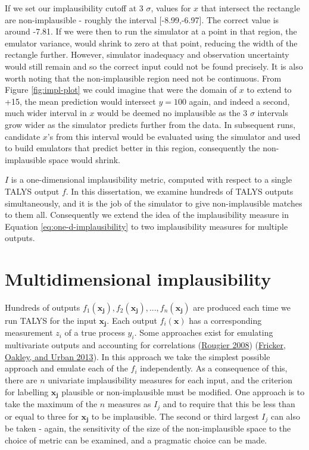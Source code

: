\documentclass[
  12pt,
  a4paper,
  twoside]{book}
\begin{document}
If we set our implausibility cutoff at 3 \(\sigma\), values for \(x\) that intersect the rectangle are non-implausible - roughly the interval {[}-8.99,-6.97{]}. The correct value is around -7.81. If we were then to run the simulator at a point in that region, the emulator variance, would shrink to zero at that point, reducing the width of the rectangle further. However, simulator inadequacy and observation uncertainty would still remain and so the correct input could not be found precisely. It is also worth noting that the non-implausible region need not be continuous. From Figure \ref{fig:impl-plot} we could imagine that were the domain of \(x\) to extend to +15, the mean prediction would intersect \(y=100\) again, and indeed a second, much wider interval in \(x\) would be deemed no implausible as the 3 \(\sigma\) intervals grow wider as the simulator predicts further from the data. In subsequent runs, candidate \(x\)'s from this interval would be evaluated using the simulator and used to build emulators that predict better in this region, consequently the non-implausible space would shrink.

\(I\) is a one-dimensional implausibility metric, computed with respect to a single TALYS output \(f\). In this dissertation, we examine hundreds of TALYS outputs simultaneously, and it is the job of the simulator to give non-implausible matches to them all. Consequently we extend the idea of the implausibility measure in Equation \eqref{eq:one-d-implausibility} to two implausibility measures for multiple outputs.

\hypertarget{HM-Multi-D}{%
\section{Multidimensional implausibility}\label{HM-Multi-D}}

Hundreds of outputs \(f_1(\mathbf{x_j}),f_2(\mathbf{x_j}),...,f_n(\mathbf{x_j})\) are produced each time we run TALYS for the input \(\mathbf{x_j}\). Each output \(f_i(\mathbf{x})\) has a corresponding measurement \(z_i\) of a true process \(y_i\). Some approaches exist for emulating multivariate outputs and accounting for correlations (\protect\hyperlink{ref-jonty_efficient}{Rougier 2008}) (\protect\hyperlink{ref-multivariate_gp}{Fricker, Oakley, and Urban 2013}). In this approach we take the simplest possible approach and emulate each of the \(f_i\) independently. As a consequence of this, there are \(n\) univariate implausibility measures for each input, and the criterion for labelling \(\mathbf{x_j}\) plausible or non-implausible must be modified. One approach is to take the maximum of the \(n\) measures as \(I_j\) and to require that this be less than or equal to three for \(\mathbf{x_j}\) to be implausible. The second or third largest \(I_j\) can also be taken - again, the sensitivity of the size of the non-implausible space to the choice of metric can be examined, and a pragmatic choice can be made.
\end{document}
